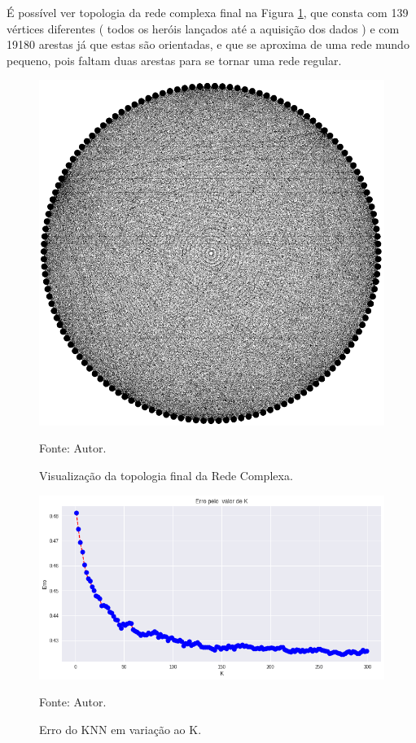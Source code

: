 É possível ver topologia da rede complexa final na Figura \ref{fig:cnfinal}, que consta com 139 vértices diferentes ( todos os heróis lançados até a aquisição dos dados ) e com 19180 arestas já que estas são orientadas, e que se aproxima de uma rede mundo pequeno, pois faltam duas arestas para se tornar uma rede regular.

\begin{figure}[H]
	\caption{Visualização da topologia final da Rede Complexa.}
	\begin{center}
		\includegraphics[width=1\textwidth]{imagens/grafofinal.png}
	\end{center}
	\small{Fonte: Autor.}
	\label{fig:cnfinal}
\end{figure}

\begin{figure}[H]
	\caption{Erro do KNN em variação ao K.}
	\begin{center}
		\includegraphics[width=1\textwidth]{imagens/knn.png}
	\end{center}
	\small{Fonte: Autor.}
	\label{fig:KNNgrafico}
\end{figure}


